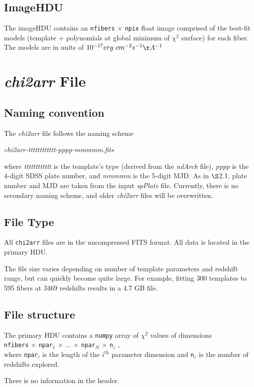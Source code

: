 \documentclass[12pt]{article}
\begin{document}
\subsection{ImageHDU}

The imageHDU contains an \texttt{nfibers} $\times$ \texttt{npix} float
image comprised of the best-fit models (template + polynomials at global
minimum of $\chi^2$ surface) for each fiber.  The models are in units of
$10^{-17} erg\ cm^{-2} s^{-1} \AA^{-1}$

\section{\textit{chi2arr} File}

\subsection{Naming convention}

The \textit{chi2arr} file follows the naming scheme

\begin{center}
	\textit{chi2arr-tttttttttttt-pppp-mmmmm.fits}
\end{center}

where \textit{tttttttttttt} is the template's type (derived from the \textit{ndArch} file),
\textit{pppp} is the 4-digit SDSS plate number, and \textit{mmmmm} is the 5-digit
MJD.  As in $\S$2.1, plate number and MJD are taken from the input \textit{spPlate} file.
Currently, there is no secondary naming scheme, and older \textit{chi2arr} files
will be overwritten.

\subsection{File Type}

All \texttt{chi2arr} files are in the uncompressed FITS format.  All data is located in the
primary HDU.

The file size varies depending on number of template parameters and redshift range,
but can quickly become quite large.  For example, fitting 300 templates to 595 fibers at
3469 redshifts results in a 4.7 GB file.

\subsection{File structure}

The primary HDU contains a \texttt{numpy} array of $\chi^2$ values of dimensions \\
\texttt{nfibers} $\times$
\texttt{npar$_1$} $\times$ ... $\times$ \texttt{npar$_N$} $\times$ \texttt{n$_z$} ,\\
where \texttt{npar$_i$} is the length of the $i^{\mathrm{th}}$ parameter dimension
and \texttt{n$_z$} is the number of redshifts explored.

There is no information in the header.
\end{document}
